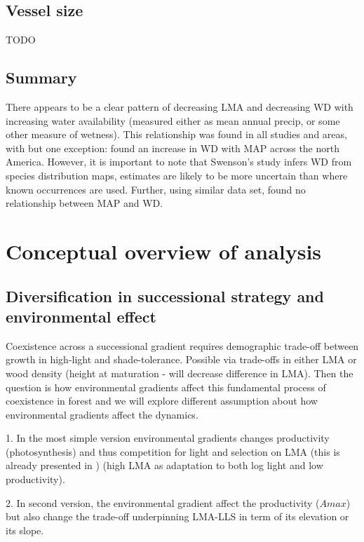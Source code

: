 \documentclass[a4paper,11pt]{article}
\begin{document}
\subsection{Vessel size}

TODO

\subsection{Summary}

There appears to be a clear pattern of decreasing LMA and decreasing WD with increasing water availability (measured either as mean annual precip, or some other measure of wetness). This relationship was found in all studies and areas, with but one exception: \citet{Swenson-2010} found an increase in WD with MAP across the north America. However, it is important to note that Swenson's study infers WD from species distribution maps, estimates are likely to be more uncertain than where known occurrences are used. Further, using similar data set, \citet{Stahl-2015} found no relationship between MAP and WD.

\section{Conceptual overview of analysis}

\subsection{Diversification in successional strategy and environmental effect}

Coexistence across a successional gradient requires demographic trade-off between growth in high-light and shade-tolerance. Possible via trade-offs in either LMA or wood density (height at maturation - will decrease difference in LMA). Then the question is how environmental gradients affect this fundamental process of coexistence in forest and we will explore different assumption about how environmental gradients
affect the dynamics.



1. In the most simple version environmental gradients changes productivity (photosynthesis) and
thus competition for light and selection on LMA (this is already presented in \citet{Falster-2016}) (high LMA as adaptation to both log light and low productivity).

2. In second version, the environmental gradient affect the productivity ($A{max}$) but also change the trade-off underpinning LMA-LLS in term of its elevation or its slope.
\end{document}
